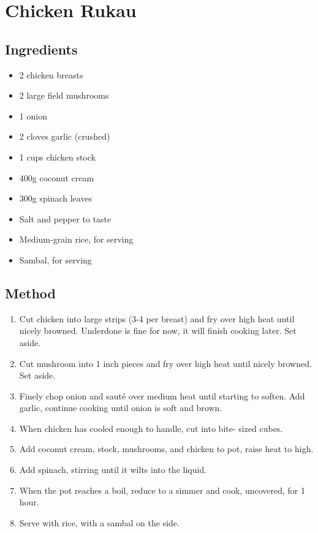 \clearpage
\section{Chicken Rukau}

  
\subsection{Ingredients}

\begin{itemize}
    \item 2 chicken breasts
    \item 2 large field mushrooms
    \item 1 onion
    \item 2 cloves garlic (crushed)
    \item 1 cups chicken stock
    \item 400g coconut cream
    \item 300g spinach leaves
    \item Salt and pepper to taste
    \item Medium-grain rice, for serving
    \item Sambal, for serving
\end{itemize}

\subsection{Method}

\begin{enumerate}
    \item Cut chicken into large strips (3-4 per breast) and fry over
    high heat until nicely browned. Underdone is fine for now, it
    will finish cooking later. Set aside.
    \item Cut mushroom into 1 inch pieces and fry over high heat until
    nicely browned. Set aside.
    \item Finely chop onion and sauté over medium heat until starting
    to soften. Add garlic, continue cooking until onion is soft and
    brown.
    \item When chicken has cooled enough to handle, cut into bite-
    sized cubes.
    \item Add coconut cream, stock, mushrooms, and chicken to pot,
    raise heat to high.
    \item Add spinach, stirring until it wilts into the liquid.
    \item When the pot reaches a boil, reduce to a simmer and cook,
    uncovered, for 1 hour.
    \item Serve with rice, with a sambal on the side.
\end{enumerate}
